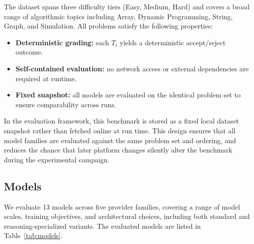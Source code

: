 \documentclass[11pt]{article}
\begin{document}
The dataset spans three difficulty tiers (Easy, Medium, Hard) and covers a broad range of algorithmic topics including Array, Dynamic Programming, String, Graph, and Simulation. All problems satisfy the following properties:
\begin{itemize}
  \item \textbf{Deterministic grading:} each $T_i$ yields a deterministic accept/reject outcome.
  \item \textbf{Self-contained evaluation:} no network access or external dependencies are required at runtime.
  \item \textbf{Fixed snapshot:} all models are evaluated on the identical problem set to ensure comparability across runs.
\end{itemize}

In the evaluation framework, this benchmark is stored as a fixed local dataset snapshot rather than fetched online at run time. This design ensures that all model families are evaluated against the same problem set and ordering, and reduces the chance that later platform changes silently alter the benchmark during the experimental campaign.

\subsection{Models}

We evaluate 13 models across five provider families, covering a range of model scales, training objectives, and architectural choices, including both standard and reasoning-specialized variants. The evaluated models are listed in Table~\ref{tab:models}.
\end{document}
